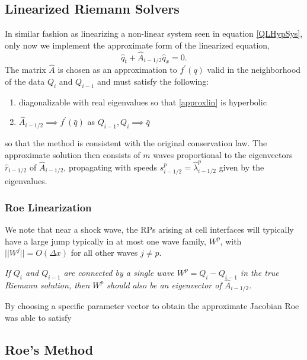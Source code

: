 \documentclass[]{article}
\begin{document}
	\subsection{Linearized Riemann Solvers}
		In similar fashion as linearizing a non-linear system seen in equation \ref{QLHypSys}, only now we implement the approximate form of the linearized equation,
		\begin{equation}
			\hat{q}_t + \hat{A}_{i-1/2}\hat{q}_x = 0.
			\label{approxlin}
		\end{equation}
		The matrix $ \hat{A} $ is chosen as an approximation to $ f^{'}(q) $ valid in the neighborhood of the data $ Q_{i} $ and $ Q_{i-1} $ and must satisfy the following:
		\begin{enumerate}
			\item diagonalizable with real eigenvalues so that \ref{approxlin} is hyperbolic
			\item $ \hat{A}_{i-1/2}  \implies f^{'}(\bar{q}) $ as $ Q_{i-1}, Q_i  \implies \bar{q} $
		\end{enumerate}
		so that the method is consistent with the original conservation law. The approximate solution then consists of $ m $ waves proportional to the eigenvectors $ \hat{r}_{i-1/2} $ of $ \hat{A}_{i-1/2} $, propagating with speeds $ s^p_{i-1/2} = \hat{\lambda}^p_{i-1/2}$ given by the eigenvalues.
	\subsubsection{Roe Linearization}
		We note that near a shock wave, the RPs arising at cell interfaces will typically have a large jump typically in at most one wave family, $ W^p $, with $ || W^j || = O(\Delta x) $ for all other waves $ j \ne  p$.
		
		\textit{If $ Q_{i} $ and $Q_{i-1} $ are connected by a single wave $ W^p = Q_i - Q_{i-1}$ in the true Riemann solution, then $ W^p $ should also be an eigenvector of $ \hat{A}_{i-1/2} $}.
		
		By choosing a specific parameter vector to obtain the approximate Jacobian Roe was able to satisfy
	
	\subsection{Roe's Method}
	
\end{document}
